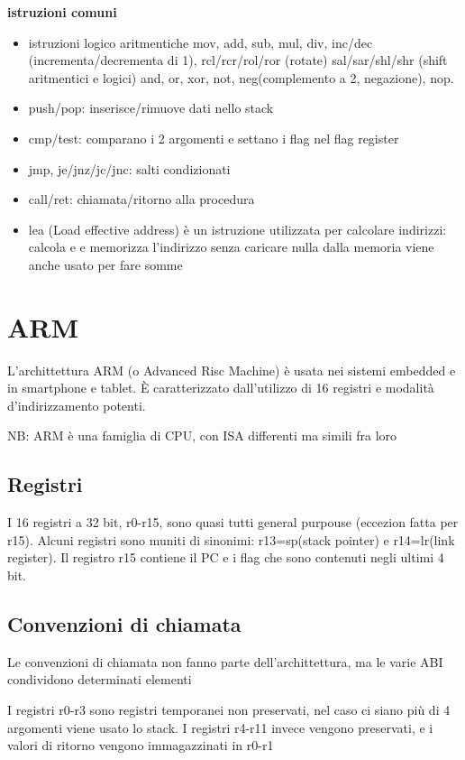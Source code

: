 \documentclass[12pt, a4paper]{article}
\begin{document}
\newpage
\textbf{istruzioni comuni}
\begin{itemize}
  \item istruzioni logico aritmentiche
  \subitem mov, add, sub, mul, div, inc/dec (incrementa/decrementa di 1), 
  \subitem rcl/rcr/rol/ror (rotate)
  \subitem sal/sar/shl/shr (shift aritmentici e logici)
  \subitem and, or, xor, not, neg(complemento a 2, negazione), nop.
  \item push/pop: inserisce/rimuove dati nello stack
  \item cmp/test: comparano i 2 argomenti e settano i flag nel flag register
  \item jmp, je/jnz/jc/jnc: salti condizionati
  \item call/ret: chiamata/ritorno alla procedura
  \item lea (Load effective address) è un istruzione utilizzata per calcolare indirizzi:
  \subitem calcola e e memorizza l'indirizzo senza caricare nulla dalla memoria
  \subitem viene anche usato per fare somme
\end{itemize}
 

\newpage
\section{ARM}
L'archittettura ARM (o Advanced Risc Machine) è usata nei sistemi embedded e in smartphone e tablet. È caratterizzato
dall'utilizzo di 16 registri e modalità d'indirizzamento potenti. 

NB: ARM è una famiglia di CPU, con ISA differenti ma simili fra loro 

\subsection{Registri}
I 16 registri a 32 bit, r0-r15, sono quasi tutti general purpouse (eccezion fatta per r15). Alcuni registri sono
muniti di sinonimi: r13=sp(stack pointer) e r14=lr(link register). Il registro r15 contiene il PC e i flag 
che sono contenuti negli ultimi 4 bit.
 
\subsection{Convenzioni di chiamata}
Le convenzioni di chiamata non fanno parte dell'archittettura, ma le varie ABI condividono determinati elementi

I registri r0-r3 sono registri temporanei non preservati, nel caso ci siano più di 4 argomenti viene usato lo stack.
I registri r4-r11 invece vengono preservati, e i valori di ritorno vengono immagazzinati in r0-r1
\end{document}
